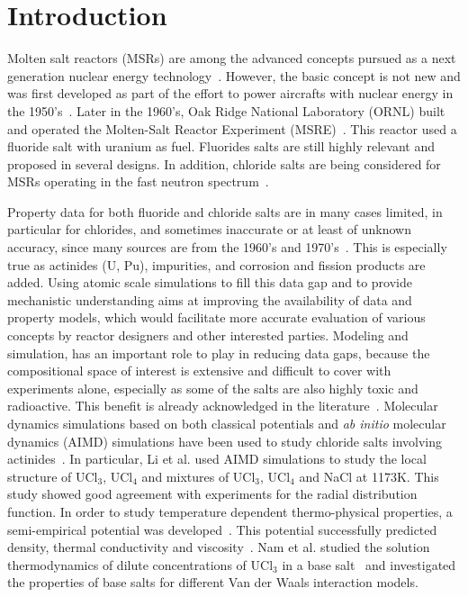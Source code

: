 \documentclass[preprint,3p,10pt,twocolumn,number,sort&compress]{elsarticle}
\begin{document}

\section{Introduction}
\label{sec:intro}
Molten salt reactors (MSRs) are among the advanced concepts pursued as a next generation nuclear energy technology~\cite{}. However, the basic concept is not new and was first developed as part of the effort to power aircrafts with nuclear energy in the 1950's~\cite{}. Later in the 1960's, Oak Ridge National Laboratory (ORNL) built and operated the Molten-Salt Reactor Experiment (MSRE)~\cite{}. This reactor used a fluoride salt with uranium as fuel. Fluorides salts are still highly relevant and proposed in several designs. In addition, chloride salts are being considered for MSRs operating in the fast neutron spectrum~\cite{}. 

Property data for both fluoride and chloride salts are in many cases limited, in particular for chlorides, and sometimes inaccurate or at least of unknown accuracy, since many sources are from the 1960's and 1970's~\cite{}. This is especially true as actinides (U, Pu), impurities, and corrosion and fission products are added. Using atomic scale simulations to fill this data gap and to provide mechanistic understanding aims at improving the availability of data and property models, which would facilitate more accurate evaluation of various concepts by reactor designers and other interested parties. 
Modeling and simulation, has an important role to play in reducing data gaps, because the compositional space of interest is extensive and difficult to cover with experiments alone, especially as some of the salts are also highly toxic and radioactive. This benefit is already acknowledged  in the literature~\cite{}. Molecular dynamics simulations based on both classical potentials and \textit{ab initio} molecular dynamics (AIMD) simulations have been used to study chloride salts involving actinides~\cite{}. In particular, Li et al. used AIMD simulations to study the local structure of UCl$_3$, UCl$_4$ and mixtures of UCl$_3$, UCl$_4$ and NaCl at 1173K. This study showed good agreement with experiments for the radial distribution function. In order to study temperature dependent thermo-physical properties, a semi-empirical potential was developed~\cite{}. This potential successfully predicted density, thermal conductivity and viscosity~\cite{}. Nam et al. studied the solution thermodynamics of dilute concentrations of UCl$_3$ in a base salt~\cite{} and investigated the properties of base salts for different Van der Waals interaction models. 
\end{document}
